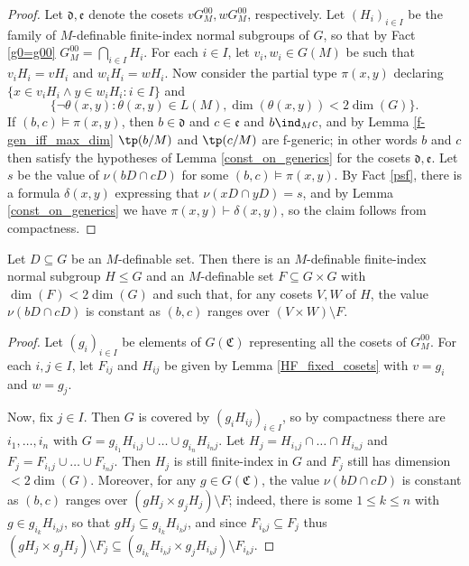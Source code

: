 \documentclass[10pt]{article}
\begin{document}
{\begin{proof}
    Let $\mathfrak{d},\mathfrak{e}$ denote the cosets $vG^{00}_M,wG^{00}_M$, respectively. Let $(H_i)_{i\in I}$ be the family of $M$-definable finite-index normal subgroups of $G$, so that by Fact \ref{g0=g00} $G^{00}_M=\bigcap_{i\in I}H_i$. For each $i\in I$, let $v_i,w_i\in G(M)$ be such that $v_iH_i=vH_i$ and $w_iH_i=wH_i$. Now consider the partial type $\pi(x,y)$ declaring $\{x\in v_iH_i\wedge y\in w_iH_i:i\in I\}$ and $$\{\neg\theta(x,y):\theta(x,y)\in L(M),\dim(\theta(x,y))<2\dim(G)\}.$$ If $(b,c)\models\pi(x,y)$, then $b\in\mathfrak{d}$ and $c\in\mathfrak{e}$ and $b\ind_M c$, and by Lemma \ref{f-gen_iff_max_dim} $\tp(b/M)$ and $\tp(c/M)$ are f-generic; in other words $b$ and $c$ then satisfy the hypotheses of Lemma \ref{const_on_generics} for the cosets $\mathfrak{d},\mathfrak{e}$. Let $s$ be the value of $\nu(bD\cap cD)$ for some $(b,c)\models\pi(x,y)$. By Fact \ref{psf}, there is a formula $\delta(x,y)$ expressing that $\nu(xD\cap yD)=s$, and by Lemma \ref{const_on_generics} we have $\pi(x,y)\vdash\delta(x,y)$, so the claim follows from compactness.
\end{proof}

\begin{lemma}\label{HF_left}
    Let $D\subseteq G$ be an $M$-definable set. Then there is an $M$-definable finite-index normal subgroup $H\leqslant G$ and an $M$-definable set $F\subseteq G\times G$ with $\dim(F)<2\dim(G)$ and such that, for any cosets $V,W$ of $H$, the value $\nu(bD\cap cD)$ is constant as $(b,c)$ ranges over $(V\times W)\setminus F$.
\end{lemma}
\begin{proof}
    Let $(g_i)_{i\in I}$ be elements of $G(\mathfrak{C})$ representing all the cosets of $G^{00}_M$. For each $i,j\in I$, let $F_{ij}$ and $H_{ij}$ be given by Lemma \ref{HF_fixed_cosets} with $v=g_i$ and $w=g_j$.
    
    Now, fix $j\in I$. Then $G$ is covered by $(g_iH_{ij})_{i\in I}$, so by compactness there are $i_1,\dots,i_n$ with $G=g_{i_1}H_{i_1j}\cup\dots\cup g_{i_n}H_{i_nj}$. Let $H_j=H_{i_1j}\cap\dots\cap H_{i_nj}$ and $F_j=F_{i_1j}\cup\dots\cup F_{i_nj}$. Then $H_j$ is still finite-index in $G$ and $F_j$ still has dimension $<2\dim(G)$. Moreover, for any $g\in G(\mathfrak{C})$, the value $\nu(bD\cap cD)$ is constant as $(b,c)$ ranges over $(gH_j\times g_jH_j)\setminus F$; indeed, there is some $1\leqslant k\leqslant n$ with $g\in g_{i_k}H_{i_kj}$, so that $gH_j\subseteq g_{i_k}H_{i_kj}$, and since $F_{i_kj}\subseteq F_j$ thus $(gH_j\times g_jH_j)\setminus F_j\subseteq (g_{i_k}H_{i_kj}\times g_jH_{i_kj})\setminus F_{i_kj}$.


\end{proof}}
\end{document}
